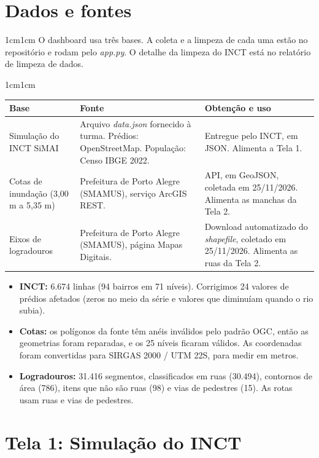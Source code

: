 \documentclass[12pt,a4paper]{article}
\newcommand{\paragrafo}[1]{%
    \begin{adjustwidth}{1cm}{1cm}
        \indent\indent #1
    \end{adjustwidth}
}
\begin{document}
\section{Dados e fontes}
    \paragrafo{O dashboard usa três bases. A coleta e a limpeza de cada uma estão no repositório e rodam pelo \textit{app.py}. O detalhe da limpeza do INCT está no relatório de limpeza de dados.}
    \begin{adjustwidth}{1cm}{1cm}
    \small
    \begin{tabularx}{\linewidth}{|>{\raggedright\arraybackslash}p{3.1cm}|>{\raggedright\arraybackslash}p{4.4cm}|X|}
        \hline
        \textbf{Base} & \textbf{Fonte} & \textbf{Obtenção e uso} \\ \hline
        Simulação do INCT SiMAI & Arquivo \textit{data.json} fornecido à turma. Prédios: OpenStreetMap. População: Censo IBGE 2022. & Entregue pelo INCT, em JSON. Alimenta a Tela 1. \\ \hline
        Cotas de inundação (3,00 m a 5,35 m) & Prefeitura de Porto Alegre (SMAMUS), serviço ArcGIS REST. & API, em GeoJSON, coletada em 25/11/2026. Alimenta as manchas da Tela 2. \\ \hline
        Eixos de logradouros & Prefeitura de Porto Alegre (SMAMUS), página Mapas Digitais. & Download automatizado do \textit{shapefile}, coletado em 25/11/2026. Alimenta as ruas da Tela 2. \\ \hline
    \end{tabularx}
    \end{adjustwidth}
    \vspace{0.5em}
    \begin{itemize}
        \item \textbf{INCT:} 6.674 linhas (94 bairros em 71 níveis). Corrigimos 24 valores de prédios afetados (zeros no meio da série e valores que diminuíam quando o rio subia).
        \item \textbf{Cotas:} os polígonos da fonte têm anéis inválidos pelo padrão OGC, então as geometrias foram reparadas, e os 25 níveis ficaram válidos. As coordenadas foram convertidas para SIRGAS 2000 / UTM 22S, para medir em metros.
        \item \textbf{Logradouros:} 31.416 segmentos, classificados em ruas (30.494), contornos de área (786), itens que não são ruas (98) e vias de pedestres (15). As rotas usam ruas e vias de pedestres.
    \end{itemize}

\section{Tela 1: Simulação do INCT}
\end{document}
